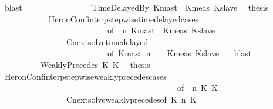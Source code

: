 \begin{isabellebody}
\ blast\isanewline
\ \ \ \ \ \ \isamarkupfalse%
\isanewline
\ \ \ \ \ \ \ \ \isamarkupfalse%
\ {\isacharparenleft}TimeDelayedBy\ Kmast\ {\isasymtau}\ Kmeas\ Kslave{\isacharparenright}\ \isamarkupfalse%
\ {\isacharquery}thesis\isanewline
\ \ \ \ \ \ \ \ \ \ \isamarkupfalse%
\ HeronConf{\isacharunderscore}interp{\isacharunderscore}stepwise{\isacharunderscore}timedelayed{\isacharunderscore}cases\isanewline
\ \ \ \ \ \ \ \ \ \ \ \ \ \ \ \ \ \ \ \ \ \ \ \ \ \ {\isacharbrackleft}of\ {\isacartoucheopen}{\isasymGamma}{\isacartoucheclose}\ {\isacartoucheopen}n{\isacartoucheclose}\ {\isacartoucheopen}Kmast{\isacartoucheclose}\ {\isacartoucheopen}{\isasymtau}{\isacartoucheclose}\ {\isacartoucheopen}Kmeas{\isacartoucheclose}\ {\isacartoucheopen}Kslave{\isacartoucheclose}\ {\isacartoucheopen}{\isasymPsi}{\isacartoucheclose}\ {\isacartoucheopen}{\isasymPhi}{\isacartoucheclose}{\isacharbrackright}\isanewline
\ \ \ \ \ \ \ \ \ \ \ \ \ \ \ \ Cnext{\isacharunderscore}solve{\isacharunderscore}timedelayed\isanewline
\ \ \ \ \ \ \ \ \ \ \ \ \ \ \ \ \ \ \ \ \ \ \ \ \ \ {\isacharbrackleft}of\ {\isacartoucheopen}Kmast{\isacartoucheclose}\ {\isacartoucheopen}n{\isacartoucheclose}\ {\isacartoucheopen}{\isasymGamma}{\isacartoucheclose}\ {\isacartoucheopen}{\isasymPsi}{\isacartoucheclose}\ {\isacartoucheopen}{\isasymtau}{\isacartoucheclose}\ {\isacartoucheopen}Kmeas{\isacartoucheclose}\ {\isacartoucheopen}Kslave{\isacartoucheclose}\ {\isacartoucheopen}{\isasymPhi}{\isacartoucheclose}{\isacharbrackright}\ \isamarkupfalse%
\ blast\isanewline
\ \ \ \ \ \ \isamarkupfalse%
\isanewline
\ \ \ \ \ \ \ \ \isamarkupfalse%
\ {\isacharparenleft}WeaklyPrecedes\ K{}\ K{}{\isacharparenright}\ \isamarkupfalse%
\ {\isacharquery}thesis\isanewline
\ \ \ \ \ \ \ \ \ \ \isamarkupfalse%
\ HeronConf{\isacharunderscore}interp{\isacharunderscore}stepwise{\isacharunderscore}weakly{\isacharunderscore}precedes{\isacharunderscore}cases\isanewline
\ \ \ \ \ \ \ \ \ \ \ \ \ \ \ \ \ \ \ \ \ \ \ \ \ \ \ \ \ \ \ \ \ \ \ \ \ \ \ \ \ \ \ {\isacharbrackleft}of\ {\isacartoucheopen}{\isasymGamma}{\isacartoucheclose}\ {\isacartoucheopen}n{\isacartoucheclose}\ {\isacartoucheopen}K{}{\isacartoucheclose}\ {\isacartoucheopen}K{}{\isacartoucheclose}\ {\isacartoucheopen}{\isasymPsi}{\isacartoucheclose}\ {\isacartoucheopen}{\isasymPhi}{\isacartoucheclose}{\isacharbrackright}\isanewline
\ \ \ \ \ \ \ \ \ \ \ \ \ \ \ \ Cnext{\isacharunderscore}solve{\isacharunderscore}weakly{\isacharunderscore}precedes{\isacharbrackleft}of\ {\isacartoucheopen}K{}{\isacartoucheclose}\ {\isacartoucheopen}n{\isacartoucheclose}\ {\isacartoucheopen}K{}{\isacartoucheclose}\ {\isacartoucheopen}{\isasymGamma}{\isacartoucheclose}\ {\isacartoucheopen}{\isasymPsi}{\isacartoucheclose}\ \ {\isacartoucheopen}{\isasymPhi}{\isacartoucheclose}{\isacharbrackright}\isanewline

\end{isabellebody}
